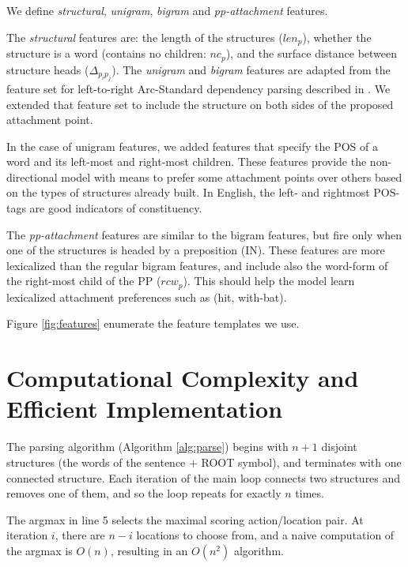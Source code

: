 \documentclass[11pt]{article}
\begin{document}
We define \textit{structural}, \textit{unigram}, \textit{bigram} and \textit{pp-attachment} features.

The \textit{structural} features are: the length of the structures ($len_p$), whether the structure is a word (contains no children: $nc_p$), and the surface distance between structure heads ($\Delta_{p_ip_j}$).
The \textit{unigram} and \textit{bigram} features are adapted from the feature set for left-to-right Arc-Standard dependency parsing described in \cite{wenbin-arcstandard}.  We extended that feature set to include the structure on both sides of the proposed attachment point.

In the case of unigram features, we added features that specify the POS of a word and its left-most and right-most children.  %
These features provide the non-directional model with means to prefer some attachment points over others based on the types of structures already built.  In English, the left- and rightmost POS-tags are good indicators of constituency.

The \textit{pp-attachment} features are similar to the bigram features, but fire only when one of the structures is headed by a preposition (IN).  These features are more lexicalized than the regular bigram features, and include also the word-form of the right-most child of the PP ($rcw_p$).  
This should help the model learn lexicalized attachment preferences such as (hit, with-bat).

Figure \ref{fig:features} enumerate the feature templates we use.


\vspace{-6pt}
\section{Computational Complexity and Efficient Implementation}
\vspace{-6pt}

The parsing algorithm (Algorithm \ref{alg:parse}) begins with $n+1$ disjoint structures (the words of the sentence + ROOT symbol), and terminates with one connected structure.  Each iteration of the main loop connects two structures and removes one of them, and so the loop repeats for exactly $n$ times.  

The argmax in line 5 selects the maximal scoring action/location pair.  At iteration $i$, there are $n-i$ locations to choose from, and a naive computation of the argmax is $O(n)$, resulting in an $O(n^2)$ algorithm.
\end{document}
